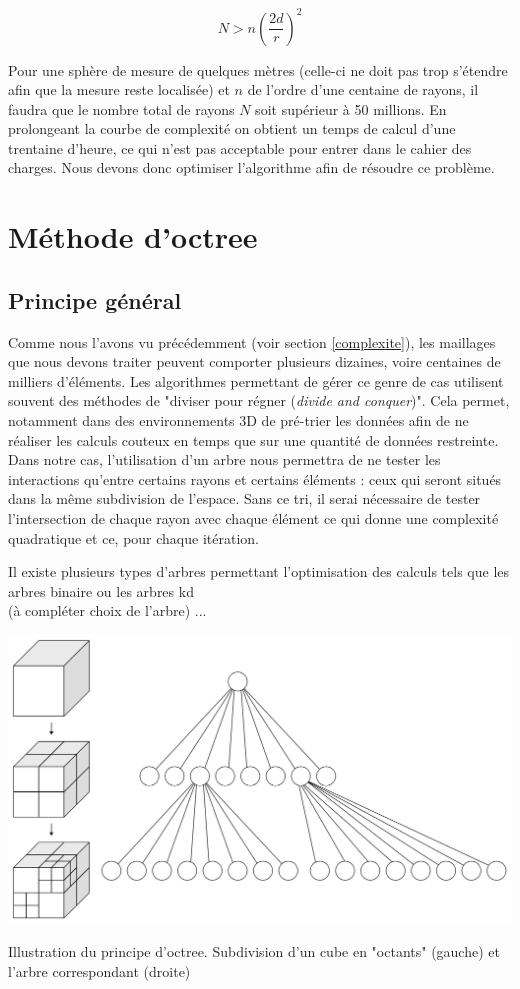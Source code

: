 \begin{equation}
N > n(\frac{2d}{r})^2
\end{equation}

Pour une sphère de mesure de quelques mètres (celle-ci ne doit pas trop s'étendre afin que la mesure reste localisée) et $n$ de l'ordre d'une centaine de rayons, il faudra que le nombre total de rayons $N$ soit supérieur à 50 millions. En prolongeant la courbe de complexité on obtient un temps de calcul d'une trentaine d'heure, ce qui n'est pas acceptable pour entrer dans le cahier des charges. Nous devons donc optimiser l'algorithme afin de résoudre ce problème.

\section{Méthode d'octree}
\subsection{Principe général}

Comme nous l'avons vu précédemment (voir section \ref{complexite}), les maillages que nous devons traiter peuvent comporter plusieurs dizaines, voire centaines de milliers d'éléments. Les algorithmes permettant de gérer ce genre de cas utilisent souvent des méthodes de "diviser pour régner (\textit{divide and conquer})". Cela permet, notamment dans des environnements 3D de pré-trier les données afin de ne réaliser les calculs couteux en temps que sur une quantité de données restreinte. Dans notre cas, l'utilisation d'un arbre nous permettra de ne tester les interactions qu'entre certains rayons et certains éléments : ceux qui seront situés dans la même subdivision de l'espace. Sans ce tri, il serai nécessaire de tester l'intersection de chaque rayon avec chaque élément ce qui donne une complexité quadratique et ce, pour chaque itération. 

Il existe plusieurs types d'arbres permettant l'optimisation des calculs tels que les arbres binaire ou les arbres kd \\
(à compléter choix de l'arbre) ...


\begin{figureth}
	\includegraphics[width=0.6\linewidth]{images/octree}
	\caption{Illustration du principe d'\gls{octree}. Subdivision d'un cube en "octants" (gauche) et l'arbre correspondant (droite)}
	\label{octree}
\end{figureth}

